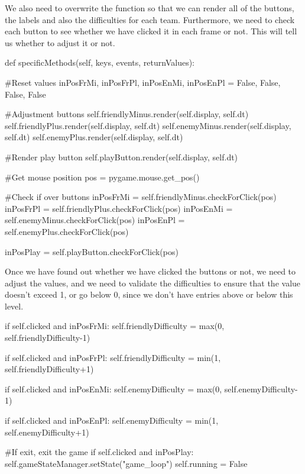 We also need to overwrite the  function so that we can render all of the buttons, the labels and also the difficulties for each team. Furthermore, we need to check each button to see whether we have clicked it in each frame or not. This will tell us whether to adjust it or not.

\begin{mpy}
    def specificMethods(self, keys, events, returnValues):

        #Reset values
        inPosFrMi, inPosFrPl, inPosEnMi, inPosEnPl = False, False, False, False

        #Adjustment buttons
        self.friendlyMinus.render(self.display, self.dt)
        self.friendlyPlus.render(self.display, self.dt)
        self.enemyMinus.render(self.display, self.dt)
        self.enemyPlus.render(self.display, self.dt)

        #Render play button
        self.playButton.render(self.display, self.dt)

        #Get mouse position
        pos = pygame.mouse.get_pos()

        #Check if over buttons
        inPosFrMi = self.friendlyMinus.checkForClick(pos)
        inPosFrPl = self.friendlyPlus.checkForClick(pos)
        inPosEnMi = self.enemyMinus.checkForClick(pos)
        inPosEnPl = self.enemyPlus.checkForClick(pos)

        inPosPlay = self.playButton.checkForClick(pos)
\end{mpy}

Once we have found out whether we have clicked the buttons or not, we need to adjust the values, and we need to validate the difficulties to ensure that the value doesn't exceed 1, or go below 0, since we don't have entries above or below this level.

\begin{mpy}
        if self.clicked and inPosFrMi:
            self.friendlyDifficulty = max(0, self.friendlyDifficulty-1)


        if self.clicked and inPosFrPl:
            self.friendlyDifficulty = min(1, self.friendlyDifficulty+1)
            

        if self.clicked and inPosEnMi:
            self.enemyDifficulty = max(0, self.enemyDifficulty-1)


        if self.clicked and inPosEnPl:
            self.enemyDifficulty = min(1, self.enemyDifficulty+1)


        #If exit, exit the game
        if self.clicked and inPosPlay:
            self.gameStateManager.setState("game_loop")
            self.running = False
\end{mpy}

